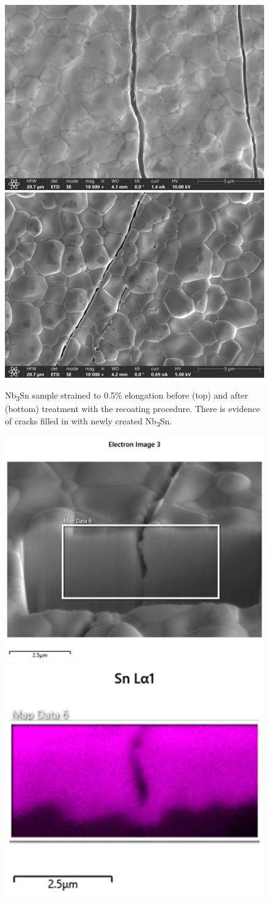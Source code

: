 \begin{figure}
    \label{fig:SEM}
    \includegraphics[width=0.5\columnwidth]{./figures/SEM/1.jpg}
    \includegraphics[width=0.5\columnwidth]{./figures/SEM/2.jpg}
    \caption{Nb\textsubscript{3}Sn sample strained to 0.5\% elongation before (top) and after (bottom) treatment with the recoating procedure. There is evidence of cracks filled in with newly created Nb\textsubscript{3}Sn.}
\end{figure}

\begin{figure}
    \label{fig:EDS}
    \includegraphics[width=0.5\columnwidth]{./figures/EDS/image.png}
    \includegraphics[width=0.5\columnwidth]{./figures/EDS/image (1).png}
\end{figure}


